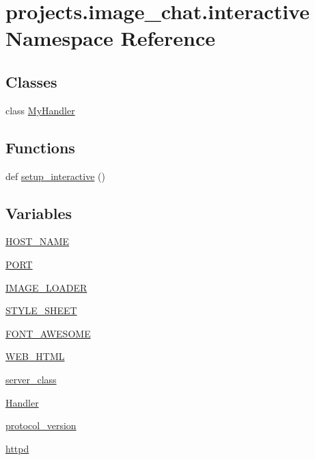 \hypertarget{namespaceprojects_1_1image__chat_1_1interactive}{}\section{projects.\+image\+\_\+chat.\+interactive Namespace Reference}
\label{namespaceprojects_1_1image__chat_1_1interactive}
\subsection*{Classes}
\begin{DoxyCompactItemize}
\item 
class \hyperlink{classprojects_1_1image__chat_1_1interactive_1_1MyHandler}{My\+Handler}
\end{DoxyCompactItemize}
\subsection*{Functions}
\begin{DoxyCompactItemize}
\item 
def \hyperlink{namespaceprojects_1_1image__chat_1_1interactive_a44c69eb8136c100209f99644e41407b0}{setup\+\_\+interactive} ()
\end{DoxyCompactItemize}
\subsection*{Variables}
\begin{DoxyCompactItemize}
\item 
\hyperlink{namespaceprojects_1_1image__chat_1_1interactive_a9caa2a471f6fb7637f86ed68ab92d554}{H\+O\+S\+T\+\_\+\+N\+A\+ME}
\item 
\hyperlink{namespaceprojects_1_1image__chat_1_1interactive_a377a6f729efcfee287f01bec353907f1}{P\+O\+RT}
\item 
\hyperlink{namespaceprojects_1_1image__chat_1_1interactive_a5e49658669731b75d6a0de3f1d29bd7e}{I\+M\+A\+G\+E\+\_\+\+L\+O\+A\+D\+ER}
\item 
\hyperlink{namespaceprojects_1_1image__chat_1_1interactive_ac608e0d1cd8d7537f011126d9e83f906}{S\+T\+Y\+L\+E\+\_\+\+S\+H\+E\+ET}
\item 
\hyperlink{namespaceprojects_1_1image__chat_1_1interactive_a180951d02b686de24635f35e1a6dfbc5}{F\+O\+N\+T\+\_\+\+A\+W\+E\+S\+O\+ME}
\item 
\hyperlink{namespaceprojects_1_1image__chat_1_1interactive_a7fdf370bcd1898b37f197ac795c44b75}{W\+E\+B\+\_\+\+H\+T\+ML}
\item 
\hyperlink{namespaceprojects_1_1image__chat_1_1interactive_a54b092d0eb15cb8decf78688b1a6fe6d}{server\+\_\+class}
\item 
\hyperlink{namespaceprojects_1_1image__chat_1_1interactive_ac51164d011818446d45924028cd6183f}{Handler}
\item 
\hyperlink{namespaceprojects_1_1image__chat_1_1interactive_a24d446284e43e25d167faf0949848249}{protocol\+\_\+version}
\item 
\hyperlink{namespaceprojects_1_1image__chat_1_1interactive_a2c0d464fafcbcedd9b56aaf2a253e6ca}{httpd}
\end{DoxyCompactItemize}


